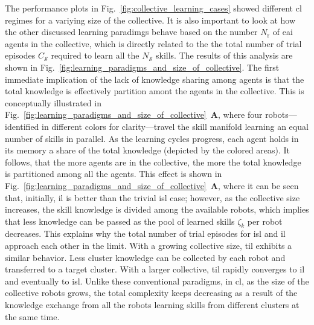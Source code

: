 \documentclass[12pt]{article}
\begin{document}
The performance plots in Fig.~\ref{fig:collective_learning_cases} showed different \ac{cl} regimes for a variying size of the collective. It is also important to look at how the other discussed learning paradimgs behave based on the number $N_\mathrm{r}$ of \ac{eai} agents in the collective, which is directly related to the the total number of trial episodes $C_\mathcal{S}$ required to learn all the $N_\mathcal{S}$ skills. The results of this analysis are shown in Fig.~\ref{fig:learning_paradigms_and_size_of_collective}. The first immediate implication of the lack of knowledge sharing among agents is that the total knowledge is effectively partition amont the agents in the collective. This is conceptually illustrated in Fig.~\ref{fig:learning_paradigms_and_size_of_collective}~\textbf{A}, where four robots---identified in different colors for clarity---travel the skill manifold learning an equal number of skills in parallel. As the learning cycles progress, each agent holds in its memory a share of the total knowledge (depicted by the colored areas). It follows, that the more agents are in the collective, the more the total knowledge is partitioned among all the agents. This effect is shown in Fig.~\ref{fig:learning_paradigms_and_size_of_collective}~\textbf{A}, where it can be seen that, initially, \ac{il} is better than the trivial \ac{isl} case; however, as the collective size increases, the skill knowledge is divided among the available robots, which implies that less knowledge can be passed as the pool of learned skills $\zeta_k$ per robot decreases. This explains why the total number of trial episodes for \ac{isl} and \ac{il} approach each other in the limit. With a growing collective size, \ac{til} exhibits a similar behavior. Less cluster knowledge can be collected by each robot and transferred to a target cluster. With a larger collective, \ac{til} rapidly converges to \ac{il} and eventually to \ac{isl}. Unlike these conventional paradigms, in \ac{cl}, as the size of the collective robots grows, the total complexity keeps decreasing as a result of the knowledge exchange from all the robots learning skills from different clusters at the same time.

\end{document}
